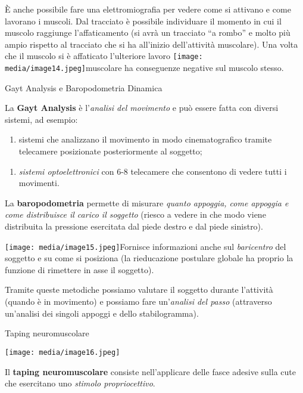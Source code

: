 \documentclass[]{article}
\begin{document}
È anche possibile fare una elettromiografia per vedere come si attivano
e come lavorano i muscoli. Dal tracciato è possibile individuare il
momento in cui il muscolo raggiunge l'affaticamento (si avrà un
tracciato ``a rombo'' e molto più ampio rispetto al tracciato che si ha
all'inizio dell'attività muscolare). Una volta che il muscolo si è
affaticato l'ulteriore lavoro
\texttt{[image: media/image14.jpeg]}muscolare
ha conseguenze negative sul muscolo stesso.

Gayt Analysis e Baropodometria Dinamica

La \textbf{Gayt Analysis} è l'\emph{analisi del movimento} e può essere
fatta con diversi sistemi, ad esempio:

\begin{enumerate}
\def\labelenumi{\arabic{enumi}.}
\item
  sistemi che analizzano il movimento in modo cinematografico tramite
  telecamere posizionate posteriormente al soggetto;
\end{enumerate}

\begin{enumerate}
\def\labelenumi{\arabic{enumi}.}
\item
  \emph{sistemi optoelettronici} con 6-8 telecamere che consentono di
  vedere tutti i movimenti.
\end{enumerate}

La \textbf{baropodometria} permette di misurare \emph{quanto appoggia,
come appoggia e come distribuisce il carico il soggetto} (riesco a
vedere in che modo viene distribuita la pressione esercitata dal piede
destro e dal piede sinistro).

\texttt{[image: media/image15.jpeg]}Fornisce
informazioni anche sul \emph{baricentro} del soggetto e su come si
posiziona (la rieducazione postulare globale ha proprio la funzione di
rimettere in asse il soggetto).

Tramite queste metodiche possiamo valutare il soggetto durante
l'attività (quando è in movimento) e possiamo fare un'\emph{analisi del
passo} (attraverso un'analisi dei singoli appoggi e dello
stabilogramma).

Taping neuromuscolare

\texttt{[image: media/image16.jpeg]}

Il \textbf{taping neuromuscolare} consiste nell'applicare delle fasce
adesive sulla cute che esercitano uno \emph{stimolo propriocettivo}.
\end{document}
